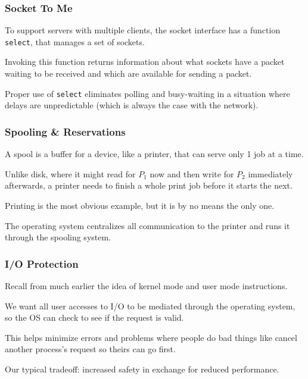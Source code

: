 \begin{frame}
\frametitle{Socket To Me}

To support servers with multiple clients, the socket interface has a function \texttt{select}, that manages a set of sockets. 

Invoking this function returns information about what sockets have a packet waiting to be received and which are available for sending a packet. 

Proper use of \texttt{select} eliminates polling and busy-waiting in a situation where delays are unpredictable (which is always the case with the network).


\end{frame}

\begin{frame}
\frametitle{Spooling \& Reservations}

A \alert{spool} is a buffer for a device, like a printer, that can serve only 1 job at a time. 

Unlike disk, where it might read for $P_{1}$ now and then write for $P_{2}$ immediately afterwards, a printer needs to finish a whole print job before it starts the next. 

Printing is the most obvious example, but it is by no means the only one. 

The operating system centralizes all communication to the printer and runs it through the spooling system. 


\end{frame}



\begin{frame}
\frametitle{I/O Protection}

Recall from much earlier the idea of kernel mode and user mode instructions. 

We want all user accesses to I/O to be mediated through the operating system, so the OS can check to see if the request is valid. 

This helps minimize errors and problems where people do bad things like cancel another process's request so theirs can go first. 

Our typical tradeoff: increased safety in exchange for reduced performance.



\end{frame}

